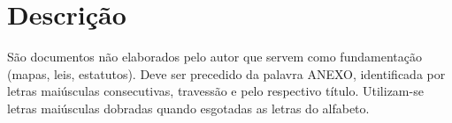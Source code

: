 \chapter{Descrição}

São documentos não elaborados pelo autor que servem como fundamentação (mapas, leis, estatutos). Deve ser precedido da palavra ANEXO, identificada por letras maiúsculas consecutivas, travessão e pelo respectivo título. Utilizam-se letras maiúsculas dobradas quando esgotadas as letras do alfabeto. 


